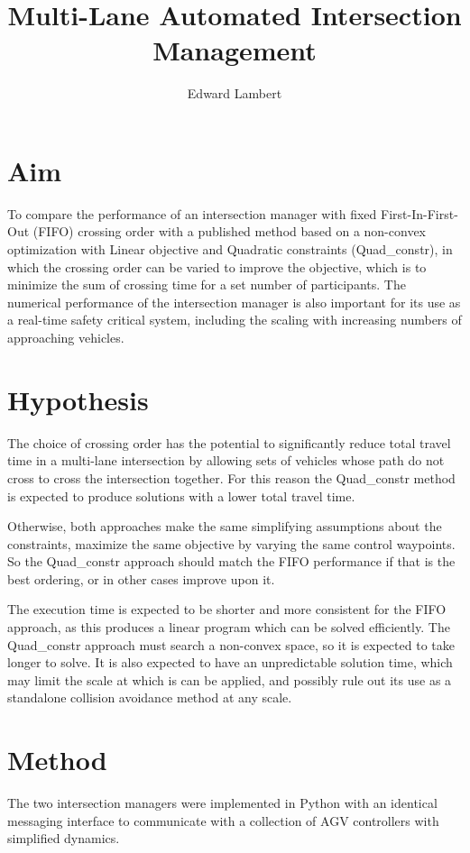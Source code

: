 \documentclass[11pt]{article} %
\author{Edward Lambert}
\title{Multi-Lane Automated Intersection Management}
\begin{document}
\maketitle
\section{Aim}
To compare the performance of an intersection manager with fixed First-In-First-Out (FIFO) crossing order with a published method based on a non-convex optimization with Linear objective and Quadratic constraints (Quad\_constr), in which the crossing order can be varied to improve the objective, which is to minimize the sum of crossing time for a set number of participants. The numerical performance of the intersection manager is also important for its use as a real-time safety critical system, including the scaling with increasing numbers of approaching vehicles. 

\section{Hypothesis}
The choice of crossing order has the potential to significantly reduce total travel time in a multi-lane intersection by allowing sets of vehicles whose path do not cross to cross the intersection together. For this reason the Quad\_constr method is expected to produce solutions with a lower total travel time.

Otherwise, both approaches make the same simplifying assumptions about the constraints, maximize the same objective by varying the same control waypoints. So the Quad\_constr approach should match the FIFO performance if that is the best ordering, or in other cases improve upon it.

The execution time is expected to be shorter and more consistent for the FIFO approach, as this produces a linear program which can be solved efficiently. The Quad\_constr approach must search a non-convex space, so it is expected to take longer to solve. It is also expected to have an unpredictable solution time, which may limit the scale at which is can be applied, and possibly rule out its use as a  standalone collision avoidance method at any scale.

\section{Method}
The two intersection managers were implemented in Python with an identical messaging interface to communicate with a collection of AGV controllers with simplified dynamics. 
\end{document}
